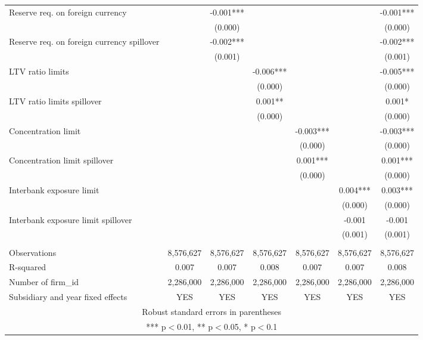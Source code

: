\begin{tabular}{lcccccc}
Reserve req. on foreign currency &  & -0.001*** &  &  &  & -0.001*** \\
 &  & (0.000) &  &  &  & (0.000) \\
Reserve req. on foreign currency spillover &  & -0.002*** &  &  &  & -0.002*** \\
 &  & (0.001) &  &  &  & (0.001) \\
LTV ratio limits &  &  & -0.006*** &  &  & -0.005*** \\
 &  &  & (0.000) &  &  & (0.000) \\
LTV ratio limits spillover &  &  & 0.001** &  &  & 0.001* \\
 &  &  & (0.000) &  &  & (0.000) \\
Concentration limit &  &  &  & -0.003*** &  & -0.003*** \\
 &  &  &  & (0.000) &  & (0.000) \\
Concentration limit spillover &  &  &  & 0.001*** &  & 0.001*** \\
 &  &  &  & (0.000) &  & (0.000) \\
Interbank exposure limit &  &  &  &  & 0.004*** & 0.003*** \\
 &  &  &  &  & (0.000) & (0.000) \\
Interbank exposure limit spillover &  &  &  &  & -0.001 & -0.001 \\
 &  &  &  &  & (0.001) & (0.001) \\
 &  &  &  &  &  &  \\
Observations & 8,576,627 & 8,576,627 & 8,576,627 & 8,576,627 & 8,576,627 & 8,576,627 \\
R-squared & 0.007 & 0.007 & 0.008 & 0.007 & 0.007 & 0.008 \\
Number of firm\_id & 2,286,000 & 2,286,000 & 2,286,000 & 2,286,000 & 2,286,000 & 2,286,000 \\
 Subsidiary and year fixed effects & YES & YES & YES & YES & YES & YES \\ \hline
\multicolumn{7}{c}{ Robust standard errors in parentheses} \\
\multicolumn{7}{c}{ *** p$<$0.01, ** p$<$0.05, * p$<$0.1} \\
\end{tabular}
